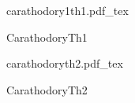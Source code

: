 \documentclass[a4paper,usenames,dvipsnames]{article}
\newcommand{\incfig}[1]{%
    \def\svgwidth{\columnwidth}
    {#1.pdf_tex}
}
\begin{document}
\begin{figure}[ht]
    \centering
    \incfig{carathodory1th1}
    \caption{CarathodoryTh1}
    \label{fig:carathodory1th1}
\end{figure}

\begin{figure}[ht]
    \centering
    \incfig{carathodoryth2}
    \caption{CarathodoryTh2}
    \label{fig:carathodoryth2}
\end{figure}
\end{document}
